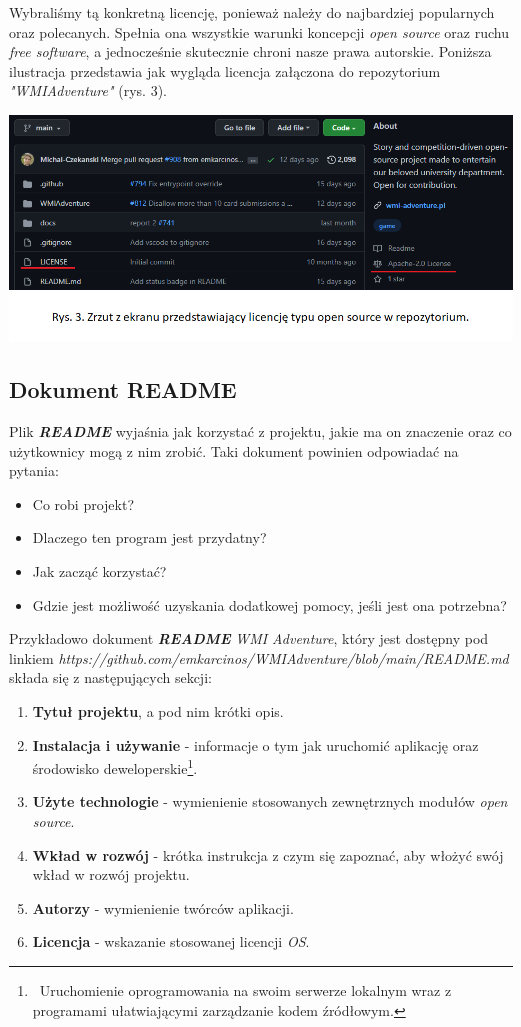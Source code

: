 \documentclass{article}
\begin{document}
Wybraliśmy tą konkretną licencję, ponieważ należy do najbardziej popularnych oraz polecanych. Spełnia ona wszystkie warunki koncepcji \emph{open source} oraz ruchu \emph{free software}, a jednocześnie skutecznie chroni nasze prawa autorskie. Poniższa ilustracja przedstawia jak wygląda licencja załączona do repozytorium \emph{"WMIAdventure"} (rys. 3).
\begin{center}
    \includegraphics[width = 1\textwidth]{licencja.png}
\end{center}

\subsection{Dokument README}

\hspace{4mm} Plik \textbf{\emph{README}} wyjaśnia jak korzystać z projektu, jakie ma on znaczenie oraz co użytkownicy mogą z nim zrobić. Taki dokument powinien odpowiadać na pytania\cite{opensource.guide}:
\begin{itemize}
    \item Co robi projekt?
    \item Dlaczego ten program jest przydatny?
    \item Jak zacząć korzystać?
    \item Gdzie jest możliwość uzyskania dodatkowej pomocy, jeśli jest ona potrzebna?
\end{itemize}

Przykładowo dokument \textbf{\emph{README}} \emph{WMI Adventure}, który jest dostępny pod linkiem \emph{https://github.com/emkarcinos/WMIAdventure/blob/main/README.md}\cite{wmi.readme} składa się z następujących sekcji:
\begin{enumerate}
    \item \textbf{Tytuł projektu}, a pod nim krótki opis.
    \item \textbf{Instalacja i używanie} - informacje o tym jak uruchomić aplikację oraz środowisko deweloperskie\footnote{\, Uruchomienie oprogramowania na swoim serwerze lokalnym wraz z programami ułatwiającymi zarządzanie kodem źródłowym.}.
    \item \textbf{Użyte technologie} - wymienienie stosowanych zewnętrznych modułów \emph{open source}.
    \item \textbf{Wkład w rozwój} - krótka instrukcja z czym się zapoznać, aby włożyć swój wkład w rozwój projektu.
    \item \textbf{Autorzy} - wymienienie twórców aplikacji.
    \item \textbf{Licencja} - wskazanie stosowanej licencji \emph{OS}.
\end{enumerate}
\end{document}
